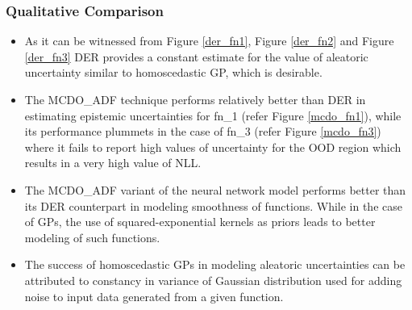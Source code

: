 \subsubsection{Qualitative Comparison}\label{sec_qual_comparison}
\begin{itemize}
	\item As it can be witnessed from Figure \ref{der_fn1}, Figure \ref{der_fn2} and Figure \ref{der_fn3} DER provides a constant estimate for the value of aleatoric uncertainty similar to homoscedastic GP, which is desirable. 
	\item The MCDO\_ADF technique  performs relatively better than DER in estimating epistemic uncertainties for fn\_1 (refer Figure \ref{mcdo_fn1}), while its performance plummets in the case of fn\_3 (refer Figure \ref{mcdo_fn3}) where it fails to report high values of uncertainty for the OOD region which results in a very high value of NLL.
	\item The MCDO\_ADF variant of the neural network model performs better than its DER counterpart in modeling smoothness of functions. While in the case of GPs, the use of squared-exponential kernels as priors leads to better modeling of such functions.  
	\item The success of homoscedastic GPs in modeling  aleatoric uncertainties can be attributed to constancy in variance of Gaussian distribution used for adding noise to input data generated from a given function. 
	
	
\end{itemize}
